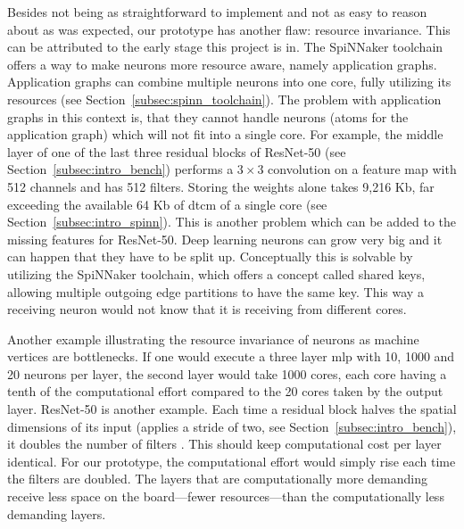 \documentclass[]{article}
\begin{document}
Besides not being as straightforward to implement and not as easy to
reason about as was expected, our prototype has another flaw: resource
invariance.
This can be attributed to the early stage this project is in.
The SpiNNaker toolchain offers a way to make neurons more resource
aware, namely application graphs.
Application graphs can combine multiple neurons
into one core, fully utilizing its resources (see
Section~\ref{subsec:spinn_toolchain}).
The problem with application graphs in this context is, that they
cannot handle neurons (atoms for the application graph) which will
not fit into a single core.
For example, the middle layer of one of the last three residual blocks
of ResNet-50 (see Section~\ref{subsec:intro_bench}) performs a
$3 \times 3$ convolution on a feature map with 512 channels and
has 512 filters.
Storing the weights alone takes 9,216 Kb, far exceeding the available
64 Kb of \acrshort{dtcm} of a single core (see Section~\ref{subsec:intro_spinn}).
This is another problem which can be added to the missing features
for ResNet-50.
Deep learning neurons can grow very big and it can happen that they
have to be split up.
Conceptually this is solvable by utilizing the SpiNNaker toolchain,
which offers a concept called shared keys, allowing multiple outgoing
edge partitions to have the same key.
This way a receiving neuron would not know that it is receiving from
different cores.

Another example illustrating the resource invariance of neurons as
machine vertices are bottlenecks.
If one would execute a three layer \acrshort{mlp} with 10, 1000 and 20 neurons
per layer, the second layer would take 1000 cores, each core having
a tenth of the computational effort compared to the 20 cores taken
by the output layer.
ResNet-50 is another example.
Each time a residual block halves the spatial dimensions of its
input (applies a stride of two, see Section~\ref{subsec:intro_bench}),
it doubles the number of filters \citep{he_et_al_2015}.
This should keep computational cost per layer identical.
For our prototype, the computational effort would simply rise each
time the filters are doubled.
The layers that are computationally more demanding receive less space
on the board---fewer resources---than the computationally less
demanding layers.
\end{document}
